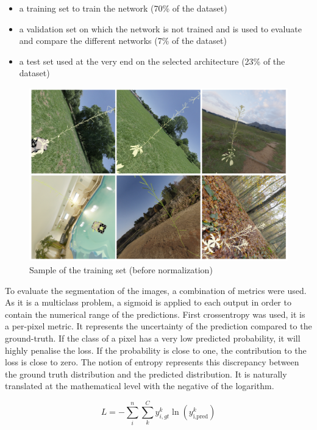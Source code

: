 \begin{itemize}
    \item a training set to train the network (70\% of the dataset)
    \item a validation set on which the network is not trained and
    is used to evaluate and compare the different networks (7\%
    of the dataset) \item a test set used at the very end on the
    selected architecture (23\% of the dataset)
\end{itemize}

\begin{figure}[h!]
	\centering \includegraphics[width = 0.9\linewidth]{figures/vscan_sample.png}
	\caption{Sample of the training set (before normalization)} \label{fig:trainset}
\end{figure}


To evaluate the segmentation of the images, a combination of
metrics were used. As it is a multiclass problem, a sigmoid is
applied to each output in order to contain the numerical range of
the predictions. First crossentropy was used, it is a per-pixel
metric. It represents the uncertainty of the prediction compared to
the ground-truth. If the class of a pixel has a very low predicted
probability, it will highly penalise the loss. If the probability
is close to one, the contribution to the loss is close to zero. The
notion of entropy represents this discrepancy between the ground truth
distribution and the predicted distribution. It is naturally translated
at the mathematical level with the negative of the logarithm.

\begin{equation}
    L =-\sum_i^n\sum_k^C{y^k_{i, gt}\ln(y_{\textrm{i},
    \textrm{pred}}^k)}
\end{equation}

